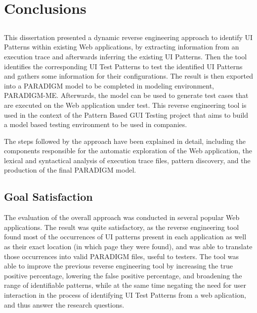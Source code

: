 \chapter{Conclusions} \label{chap:conclusion}

\section*{}



This dissertation presented a dynamic reverse engineering approach to identify UI Patterns within existing Web applications, by extracting information from an execution trace and afterwards inferring the existing UI Patterns. Then the tool identifies the corresponding UI Test Patterns to test the identified UI Patterns and gathers some information for their configurations. The result is then exported into a PARADIGM model to be completed in modeling environment, PARADIGM-ME. Afterwards, the model can be used to generate test cases that are executed on the Web application under test. This reverse engineering tool is used in the context of the Pattern Based GUI Testing project that aims to build a model based testing environment to be used in companies. 

The steps followed by the approach have been explained in detail, including the components responsible for the automatic exploration of the Web application, the lexical and syntactical analysis of execution trace files, pattern discovery, and the production of the final PARADIGM model.

\section{Goal Satisfaction}

The evaluation of the overall approach was conducted in several popular Web applications. The result was quite satisfactory, as the reverse engineering tool found most of the occurrences of UI patterns present in each application as well as their exact location (in which page they were found), and was able to translate those occurrences into valid PARADIGM files, useful to testers. The tool was able to improve the previous reverse engineering tool by increasing the true positive percentage, lowering the false positive percentage, and broadening the range of identifiable patterns, while at the same time negating the need for user interaction in the process of identifying UI Test Patterns from a web aplication, and thus answer the research questions.

